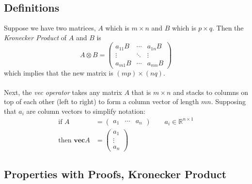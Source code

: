 \documentclass[a4paper,12pt]{scrartcl}
\begin{document}
\subsection{Definitions}
Suppose we have two matrices, $A$ which is $m \times n$ and $B$
which is $p\times q$. Then the {\sl Kronecker Product} of $A$ and $B$ is 
    \[ A \otimes B = \begin{pmatrix} a_{11} B & \cdots & a_{1n} B \\
			    \vdots & \ddots & \vdots \\
			    a_{m1} B & \cdots & a_{mn}B \end{pmatrix}
    \]
which implies that the new matrix is $(mp) \times (nq)$. 
\\
\\
Next, the {\sl vec operator} takes any matrix $A$ that is $m \times n$
and stacks to columns on top of each other (left to right) to 
form a column vector of length $mn$.  Supposing that $a_i$ are column
vectors to simplify notation:
\begin{align*}
    \text{if } A &= \begin{pmatrix} a_1 & \cdots & a_n \end{pmatrix}
	\qquad a_i \in \mathbb{R}^{n\times 1} \\
    \text{then } \mathbf{vec} A &= 
	\begin{pmatrix} a_1 \\ \vdots \\ a_n \end{pmatrix}
\end{align*}


\subsection{Properties with Proofs, Kronecker Product}
\end{document}
